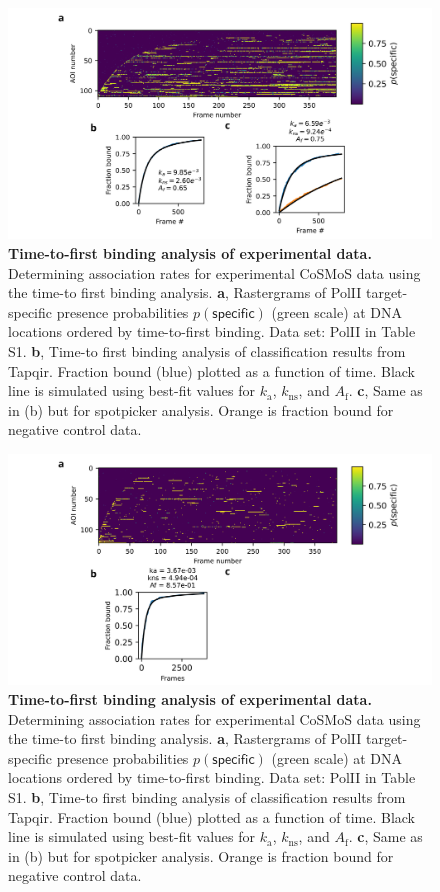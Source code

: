 \begin{figure}[t]
\centering
\includegraphics[width=183mm]{figures/sup3/sup3.png}
\caption{\textbf{Time-to-first binding analysis of experimental data.}  Determining association rates for experimental CoSMoS data using the time-to first binding analysis. \textbf{a}, Rastergrams of PolII target-specific presence probabilities $p(\mathsf{specific})$ (green scale) at DNA locations ordered by time-to-first binding. Data set: PolII in Table S1. \textbf{b}, Time-to first binding analysis of classification results from Tapqir. Fraction bound (blue) plotted as a function of time. Black line is simulated using best-fit values for $k_\mathrm{a}$, $k_\mathrm{ns}$, and $A_\mathrm{f}$. \textbf{c}, Same as in (b) but for spotpicker analysis. Orange is fraction bound for negative control data.
}
\label{fig:experimental_data}
\end{figure}

\begin{figure}[t]
\centering
\includegraphics[width=183mm]{figures/sup4/sup4.png}
\caption{\textbf{Time-to-first binding analysis of experimental data.}  Determining association rates for experimental CoSMoS data using the time-to first binding analysis. \textbf{a}, Rastergrams of PolII target-specific presence probabilities $p(\mathsf{specific})$ (green scale) at DNA locations ordered by time-to-first binding. Data set: PolII in Table S1. \textbf{b}, Time-to first binding analysis of classification results from Tapqir. Fraction bound (blue) plotted as a function of time. Black line is simulated using best-fit values for $k_\mathrm{a}$, $k_\mathrm{ns}$, and $A_\mathrm{f}$. \textbf{c}, Same as in (b) but for spotpicker analysis. Orange is fraction bound for negative control data.
}
\label{fig:experimental_data}
\end{figure}

